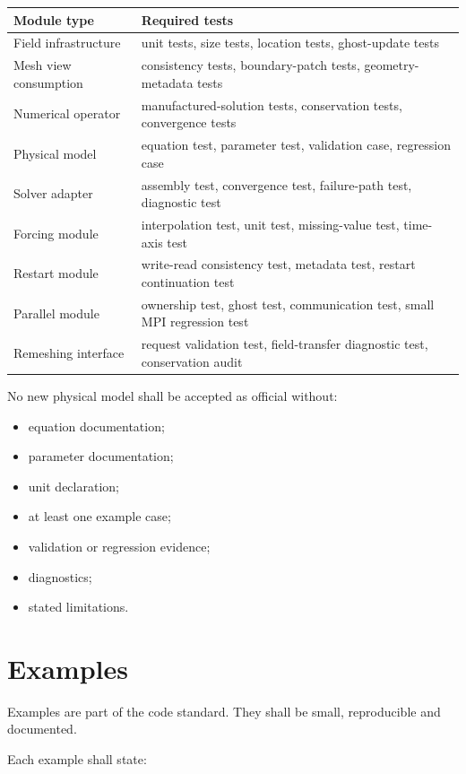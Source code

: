\documentclass[11pt,a4paper]{article}
\begin{document}
\begin{longtable}{p{}p{}}
\toprule
\textbf{Module type} & \textbf{Required tests} \\
\midrule
Field infrastructure & unit tests, size tests, location tests, ghost-update tests \\
Mesh view consumption & consistency tests, boundary-patch tests, geometry-metadata tests \\
Numerical operator & manufactured-solution tests, conservation tests, convergence tests \\
Physical model & equation test, parameter test, validation case, regression case \\
Solver adapter & assembly test, convergence test, failure-path test, diagnostic test \\
Forcing module & interpolation test, unit test, missing-value test, time-axis test \\
Restart module & write-read consistency test, metadata test, restart continuation test \\
Parallel module & ownership test, ghost test, communication test, small MPI regression test \\
Remeshing interface & request validation test, field-transfer diagnostic test, conservation audit \\
\bottomrule
\end{longtable}

No new physical model shall be accepted as official without:

\begin{itemize}
  \item equation documentation;
  \item parameter documentation;
  \item unit declaration;
  \item at least one example case;
  \item validation or regression evidence;
  \item diagnostics;
  \item stated limitations.
\end{itemize}

\section{Examples}

Examples are part of the code standard. They shall be small, reproducible and documented.

Each example shall state:
\end{document}
